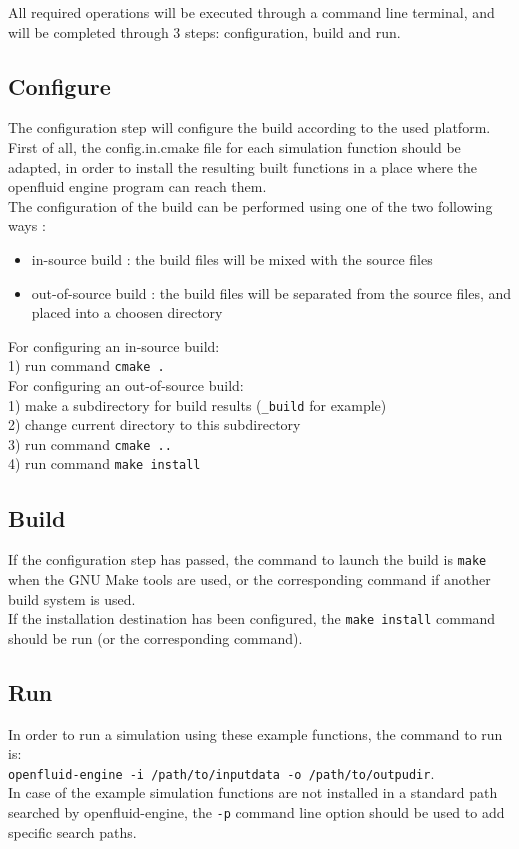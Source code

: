 \documentclass[a4paper,11pt]{article}
\begin{document}
\noindent All required operations will be executed through a command line terminal,
and will be completed through 3 steps: configuration, build and run.

\subsection{Configure}

The configuration step will configure the build according to the used platform. 
First of all, the config.in.cmake file for each simulation function should be 
adapted, in order to install the resulting built functions in a place where the 
openfluid engine program can reach them.\\

\noindent The configuration of the build can be performed using one of the two
following ways :
\begin{itemize}
\item in-source build : the build files will be mixed with the source files 
\item out-of-source build : the build files will be separated from the source files,
and placed into a choosen directory
\end{itemize}
 

\noindent For configuring an in-source build:\\
1) run command \texttt{cmake .}\\

\noindent For configuring an out-of-source build:\\
1) make a subdirectory for build results (\texttt{\_build} for example)\\
2) change current directory to this subdirectory\\
3) run command \texttt{cmake ..}\\
4) run command \texttt{make install}\\

\subsection{Build}

If the configuration step has passed, the command to launch the build is
\texttt{make} when the GNU Make tools are used, or the corresponding command
if another build system is used.\\
If the installation destination has been configured, the \texttt{make install}
command should be run (or the corresponding command).   


\subsection{Run}

In order to run a simulation using these example functions, the command to run is:\\
\texttt{openfluid-engine -i /path/to/inputdata -o /path/to/outpudir}.\\

\noindent In case of the example simulation functions are not installed in a standard path 
searched by openfluid-engine, the \texttt{-p} command line option should be used 
to add specific search paths. 
\end{document}
